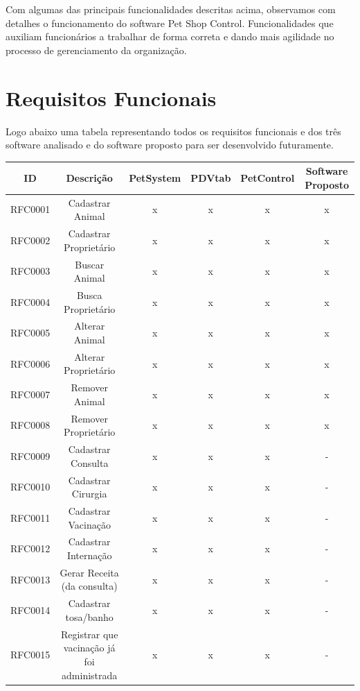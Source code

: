 \documentclass[12pt,openright,twoside,a4paper,english,french,spanish,brazil]{abntex2}
\begin{document}
Com algumas das principais funcionalidades descritas acima, observamos com detalhes o funcionamento do software Pet Shop Control. Funcionalidades que auxiliam funcionários a trabalhar de forma correta e dando mais agilidade no processo de gerenciamento da organização.
\newpage
\section*{Requisitos Funcionais}
Logo abaixo uma tabela representando todos os requisitos funcionais e dos três software analisado e do software proposto para ser desenvolvido futuramente.

\newpage
\begin{landscape}
\begin{table}[!htpb]
\centering
\begin{small} 
\setlength{\tabcolsep}{3pt} 
\begin{tabular}{rccccc}
    \toprule
    \multicolumn{1}{c}{\textbf{ID}} & \textbf{Descrição} & \textbf{PetSystem} & \textbf{PDVtab} & \textbf{PetControl} & \textbf{Software Proposto} \\
    \midrule
    RFC0001 & Cadastrar Animal & x & x & x & x \\
    RFC0002 & Cadastrar Proprietário & x & x & x & x \\
    RFC0003 & Buscar Animal & x & x & x & x \\
    RFC0004 & Busca Proprietário & x & x & x & x \\
    RFC0005 & Alterar Animal & x & x & x & x \\
    RFC0006 & Alterar Proprietário & x & x & x & x \\
    RFC0007 & Remover Animal & x & x & x & x \\
    RFC0008 & Remover Proprietário & x & x & x & x \\
    RFC0009 & Cadastrar Consulta & x & x & x & - \\
    RFC0010 & Cadastrar Cirurgia & x & x & x & - \\
    RFC0011 & Cadastrar Vacinação & x & x & x & - \\
    RFC0012 & Cadastrar Internação & x & x & x & - \\
    RFC0013 & Gerar Receita (da consulta) & x & x & x & - \\
    RFC0014 & Cadastrar tosa/banho & x & x & x & - \\
    RFC0015 & Registrar que vacinação já foi administrada & x & x & x & - \\

\end{tabular}
\end{small}
\end{table}
\end{landscape}
\end{document}

